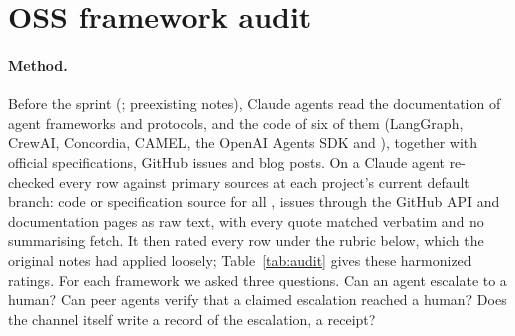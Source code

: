 \section{OSS framework audit}\label{app:audit}

\paragraph{Method.}
Before the sprint (\wtthDesignOssAuditDate; preexisting notes), Claude agents read the documentation of \wtthAuditNWord{} agent frameworks and protocols, and the code of six of them (LangGraph, CrewAI, Concordia, CAMEL, the OpenAI Agents SDK and \AGtwo), together with official specifications, GitHub issues and blog posts.
On \wtthDesignOssAuditRecheckDate{} a Claude agent re-checked every row against primary sources at each project's current default branch: code or specification source for all \wtthAuditNWord, issues through the GitHub API and documentation pages as raw text, with every quote matched verbatim and no summarising fetch.
It then rated every row under the rubric below, which the original notes had applied loosely; Table~\ref{tab:audit} gives these harmonized ratings.
For each framework we asked three questions.
Can an agent escalate to a human?
Can peer agents verify that a claimed escalation reached a human?
Does the channel itself write a record of the escalation, a receipt?


